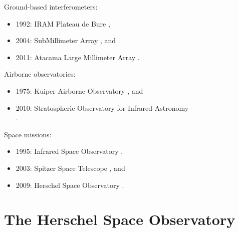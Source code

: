 \noindent\begin{minipage}{\linewidth}
Ground-based interferometers:
\begin{itemize}[noitemsep,nolistsep]
    \item 1992: IRAM Plateau de Bure             \autocite{guilloteau1992iram},
    \item 2004: SubMillimeter Array              \autocite{ho2004submillimeter}, and
    \item 2011: Atacama Large Millimeter Array   \autocite{wootten2009atacama}.
\end{itemize}
\end{minipage}

\noindent\begin{minipage}{\linewidth}
Airborne observatories:
\begin{itemize}[noitemsep,nolistsep]
    \item 1975: Kuiper Airborne Observatory                      \autocite{gillespie1981kuiper}, and
    \item 2010: Stratospheric Observatory for Infrared Astronomy\\ \autocite{becklin2012stratospheric}.
\end{itemize}
\end{minipage}

\noindent\begin{minipage}{\linewidth}
Space missions:
\begin{itemize}[noitemsep,nolistsep]
    \item 1995: Infrared Space Observatory  \autocite{isoHandbook1},
    \item 2003: Spitzer Space Telescope     \autocite{werner2004spitzer}, and
    \item 2009: Herschel Space Observatory  \autocite{AA_518_L1}.
\end{itemize}
\end{minipage}



\FloatBarrier
\section{The Herschel Space Observatory}

